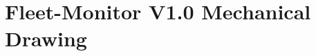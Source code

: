 \section{Fleet-Monitor V1.0 Mechanical Drawing} \label{Fleet-Monitor V1.0 Mechanical Drawing}
\enlargethispage{2.5cm}
\begin{adjustwidth}{0.23cm}{0cm} \hfuzz=7.0pt \vfuzz=20.0pt
\end{adjustwidth}
\newpage

\fi





